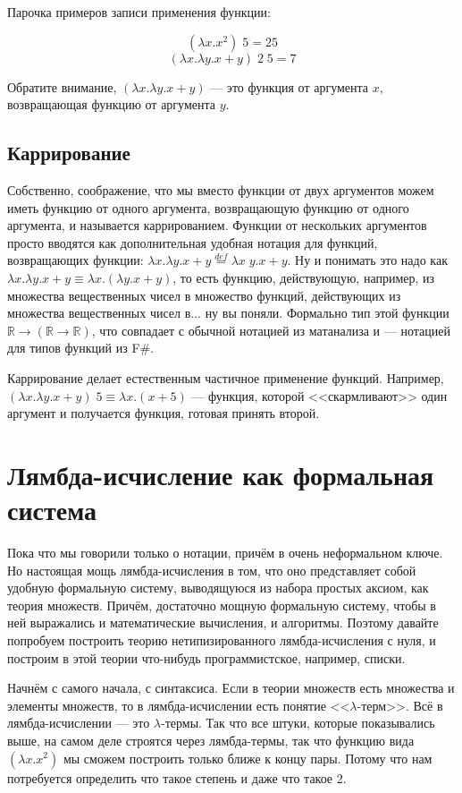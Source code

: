\documentclass{../../text-style}
\begin{document}
Парочка примеров записи применения функции:

$$(\lambda x.x^2) \; 5 = 25$$
$$(\lambda x.\lambda y.x + y) \; 2 \; 5 = 7$$

Обратите внимание, $(\lambda x.\lambda y.x + y)$ --- это функция от аргумента $x$, возвращающая функцию от аргумента $y$.

\subsection{Каррирование}

Собственно, соображение, что мы вместо функции от двух аргументов можем иметь функцию от одного аргумента, возвращающую функцию от одного аргумента, и называется каррированием. Функции от нескольких аргументов просто вводятся как дополнительная удобная нотация для функций, возвращающих функции: $\lambda x.\lambda y.x + y \stackrel{def}{=} \lambda x \; y.x + y$. Ну и понимать это надо как $\lambda x.\lambda y.x + y \equiv \lambda x.(\lambda y.x + y)$, то есть функцию, действующую, например, из множества вещественных чисел в множество функций, действующих из множества вещественных чисел в... ну вы поняли. Формально тип этой функции $\mathbb{R} \rightarrow (\mathbb{R} \rightarrow \mathbb{R})$, что совпадает с обычной нотацией из матанализа и --- нотацией для типов функций из F\#.

Каррирование делает естественным частичное применение функций. Например, $(\lambda x.\lambda y.x + y) \; 5 \equiv \lambda x.(x + 5)$ --- функция, которой <<скармливают>> один аргумент и получается функция, готовая принять второй.

\section{Лямбда-исчисление как формальная система}

Пока что мы говорили только о нотации, причём в очень неформальном ключе. Но настоящая мощь лямбда-исчисления в том, что оно представляет собой удобную формальную систему, выводящуюся из набора простых аксиом, как теория множеств. Причём, достаточно мощную формальную систему, чтобы в ней выражались и математические вычисления, и алгоритмы. Поэтому давайте попробуем построить теорию нетипизированного лямбда-исчисления с нуля, и построим в этой теории что-нибудь программистское, например, списки.

Начнём с самого начала, с синтаксиса. Если в теории множеств есть множества и элементы множеств, то в лямбда-исчислении есть понятие <<$\lambda$-терм>>. Всё в лямбда-исчислении --- это $\lambda$-термы. Так что все штуки, которые показывались выше, на самом деле строятся через лямбда-термы, так что функцию вида $(\lambda x.x^2)$ мы сможем построить только ближе к концу пары. Потому что нам потребуется определить что такое степень и даже что такое 2. 
\end{document}
